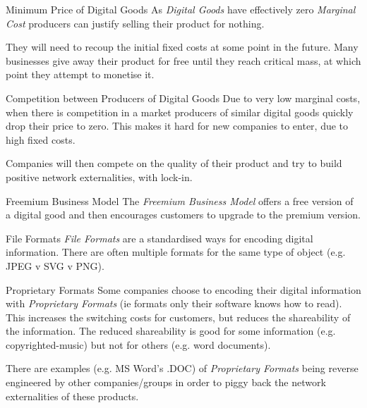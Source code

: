 \documentclass[11pt,a4paper]{article}
\begin{document}
  \begin{remark}{Minimum Price of Digital Goods}
    As \textit{Digital Goods} have effectively zero \textit{Marginal Cost} producers can justify selling their product for nothing.
    \par They will need to recoup the initial fixed costs at some point in the future. Many businesses give away their product for free until they reach critical mass, at which point they attempt to monetise it.
  \end{remark}

  \begin{remark}{Competition between Producers of Digital Goods}
    Due to very low marginal costs, when there is competition in a market producers of similar digital goods quickly drop their price to zero. This makes it hard for new companies to enter, due to high fixed costs.
    \par Companies will then compete on the quality of their product and try to build positive network externalities, with lock-in.
  \end{remark}

  \begin{definition}{Freemium Business Model}
    The \textit{Freemium Business Model} offers a free version of a digital good and then encourages customers to upgrade to the premium version.
  \end{definition}

  \begin{definition}{File Formats}
    \textit{File Formats} are a standardised ways for encoding digital information. There are often multiple formats for the same type of object (e.g. JPEG v SVG v PNG).
  \end{definition}

  \begin{remark}{Proprietary Formats}
    Some companies choose to encoding their digital information with \textit{Proprietary Formats} (ie formats only their software knows how to read). This increases the switching costs for customers, but reduces the shareability of the information. The reduced shareability is good for some information (e.g. copyrighted-music) but not for others (e.g. word documents).
    \par There are examples (e.g. MS Word's .DOC) of \textit{Proprietary Formats} being reverse engineered by other companies/groups in order to piggy back the network externalities of these products.
  \end{remark}
\end{document}
